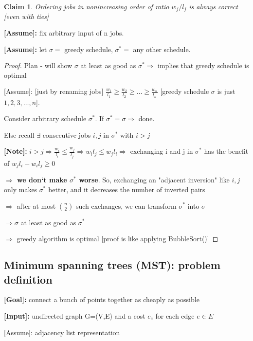 \documentclass[a4paper,12pt]{article}
\theoremstyle{plain}
\newtheorem{claim}{Claim}
\theoremstyle{definition}
\theoremstyle{remark}
\begin{document}
\begin{claim}Ordering jobs in nonincreasing order of ratio $w_j/l_j$ is always correct [even with ties]\end{claim}

\textbf{[Assume]:} fix arbitrary input of n jobs.

\textbf{[Assume]:} let $\sigma =$ greedy schedule, $\sigma^* =$ any other schedule.

\begin{proof}

Plan - will show $\sigma$ at least as good as $\sigma^* \Rightarrow$ implies that greedy schedule is optimal

[Assume]: [just by renaming jobs] $\frac{w_1}{l_1} \geq \frac{w_2}{l_2} \geq \dots \geq \frac{w_n}{l_n}$ [greedy schedule $\sigma$ is just $1,2,3,\dots,n$].

Consider arbitrary schedule $\sigma^*$. If $\sigma^* = \sigma \Rightarrow$ done.

Else recall $\exists$ consecutive jobs $i, j$ in $\sigma^*$ with $i > j$ 

\textbf{[Note]:} $i > j \Rightarrow \frac{w_i}{l_i} \leq \frac{w_j}{l_j} \Rightarrow w_il_j \leq w_jl_i \Rightarrow$ exchanging i and j in $\sigma^*$ has the benefit of $w_jl_i - w_il_j \geq 0$

\textbf{$\Rightarrow$ we don`t make $\sigma^*$ worse}. So, exchanging an "adjacent inversion" like $i, j$ only makes $\sigma^*$ better, and it decreases the number of inverted pairs

$\Rightarrow$ after at most $n \choose 2$ such exchanges, we can transform $\sigma^*$ into $\sigma$

$\Rightarrow \sigma$ at least as good as $\sigma^*$ 

$\Rightarrow$ greedy algorithm is optimal [proof is like applying BubbleSort()]
\end{proof}



\subsection{Minimum spanning trees (MST): problem definition}

\textbf{[Goal]:} connect a bunch of points together as cheaply as possible

\textbf{[Input]:} undirected graph G=(V,E) and a cost $c_e$ for each edge $e \in E$

[Assume]: adjacency list representation
\end{document}
